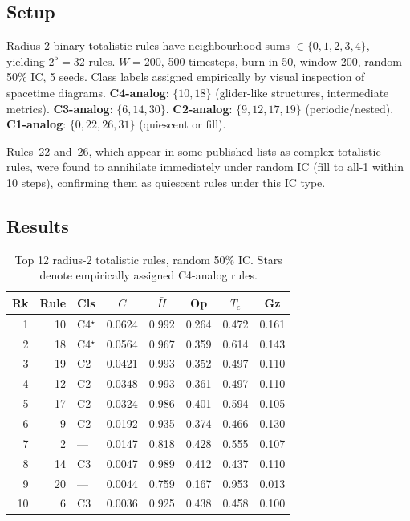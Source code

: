 \documentclass[12pt,a4paper]{article}
\begin{document}
\subsection{Setup}

Radius-2 binary totalistic rules have neighbourhood sums $\in \{0,1,2,3,4\}$,
yielding $2^5 = 32$ rules.
$W = 200$, 500 timesteps, burn-in 50, window 200, random 50\% IC, 5 seeds.
Class labels assigned empirically by visual inspection of spacetime diagrams.
\textbf{C4-analog}: $\{10, 18\}$ (glider-like structures, intermediate metrics).
\textbf{C3-analog}: $\{6, 14, 30\}$.
\textbf{C2-analog}: $\{9, 12, 17, 19\}$ (periodic/nested).
\textbf{C1-analog}: $\{0, 22, 26, 31\}$ (quiescent or fill).

Rules~22 and~26, which appear in some published lists as complex totalistic
rules, were found to annihilate immediately under random IC (fill to all-1
within 10 steps), confirming them as quiescent rules under this IC type.

\subsection{Results}

\begin{table}[h]
\centering
\caption{Top 12 radius-2 totalistic rules, random 50\% IC.
Stars denote empirically assigned C4-analog rules.}
\begin{tabular}{rrlccccc}
\toprule
Rk & Rule & Cls & $C$ & $\bar{H}$ & Op & $T_c$ & Gz \\
\midrule
 1 & 10 & C4$^\star$ & 0.0624 & 0.992 & 0.264 & 0.472 & 0.161 \\
 2 & 18 & C4$^\star$ & 0.0564 & 0.967 & 0.359 & 0.614 & 0.143 \\
 3 & 19 & C2         & 0.0421 & 0.993 & 0.352 & 0.497 & 0.110 \\
 4 & 12 & C2         & 0.0348 & 0.993 & 0.361 & 0.497 & 0.110 \\
 5 & 17 & C2         & 0.0324 & 0.986 & 0.401 & 0.594 & 0.105 \\
 6 &  9 & C2         & 0.0192 & 0.935 & 0.374 & 0.466 & 0.130 \\
 7 &  2 & ---        & 0.0147 & 0.818 & 0.428 & 0.555 & 0.107 \\
 8 & 14 & C3         & 0.0047 & 0.989 & 0.412 & 0.437 & 0.110 \\
 9 & 20 & ---        & 0.0044 & 0.759 & 0.167 & 0.953 & 0.013 \\
10 &  6 & C3         & 0.0036 & 0.925 & 0.438 & 0.458 & 0.100 \\
\bottomrule
\end{tabular}
\end{table}
\end{document}

